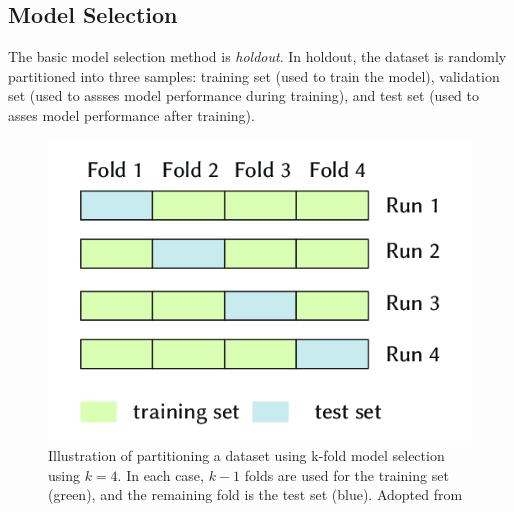 % 

\subsection{Model Selection}
\label{sec:selection}

The basic model selection method is \textit{holdout}. 
In holdout, the dataset is randomly partitioned into three 
samples: training set (used to train the model), 
validation set (used to assses model performance during training),
and test set (used to asses model performance after training). 

\begin{figure}
	\includegraphics[scale=0.7]{kfold.png}
	\caption{
		Illustration of partitioning a dataset using k-fold model 
	selection using $k = 4$. In each case, $k - 1$ folds
	are used for the training set (green), and the remaining fold is
	the test set (blue). Adopted from \citep{pedregosa2015feature}}
	\label{fig:kfold}
\end{figure}

